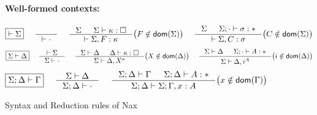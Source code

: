 \begin{figure}
\begin{framed}
\paragraph{Well-formed contexts:}
\[ \fbox{$|- \Sigma$}
 ~~~~
   \inference{}{|- \cdot}
 ~~~~
   \inference{\Sigma & \Sigma |- \kappa:\square}
             {|- \Sigma,F:\kappa}
      \big( F\notin\dom(\Sigma) \big)
 ~~~~
   \inference{\Sigma & \Sigma;\cdot |- \sigma:*}
             {|- \Sigma,C:\sigma}
      \big( C\notin\dom(\Sigma) \big)
\]
\[ \fbox{$\Sigma|- \Delta$}
 ~~~~
   \inference{|- \Sigma}{\Sigma |- \cdot}
 ~~~~
   \inference{\Sigma |- \Delta & \Delta |- \kappa:\square}
             {\Sigma |- \Delta,X^\kappa}
      \big( X\notin\dom(\Delta) \big)
 ~~~~ 
   \inference{\Sigma |- \Delta & \Sigma;\cdot |- A:*}
             {\Sigma |- \Delta,i^A}
      \big( i\notin\dom(\Delta) \big)
\]
\[ \fbox{$\Sigma;\Delta |- \Gamma$}
 ~~~~
   \inference{\Sigma |- \Delta}{\Sigma;\Delta |- \cdot}
 ~~~~
   \inference{\Sigma;\Delta |- \Gamma & \Sigma;\Delta |- A:*}
             {\Sigma;\Delta |- \Sigma;\Gamma,x:A}
      \big( x\notin\dom(\Gamma) \big)
\]
\end{framed}
\caption{Syntax and Reduction rules of Nax}
\label{fig:NaxSyntax}
\end{figure}

